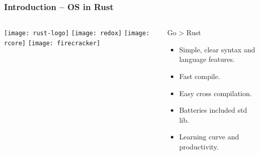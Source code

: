 \begin{frame}[plain]
	\frametitle{Introduction -- OS in Rust}
	
	
	
	\begin{columns}
		
		\begin{column}{.2\textwidth}
			
			\texttt{[image: rust-logo]}
			\texttt{[image: redox]}
			\texttt{[image: rcore]}
			\texttt{[image: firecracker]}
		\end{column}
		
		\begin{column}{.8\textwidth}
			
			Go > Rust
			
			\begin{itemize}
				
				\item Simple, clear syntax and language features.
				
				\item Fast compile.
				
				\item Easy cross compilation.
				
				\item Batteries included std lib.
				
				\item Learning curve and productivity.
				
			\end{itemize}
			
		\end{column}
		
		
	\end{columns}
	
	
\end{frame}
